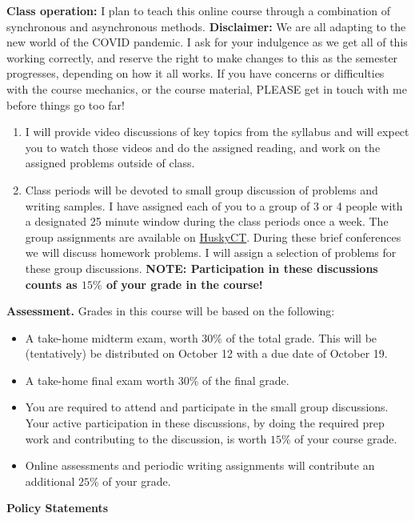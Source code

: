 \documentclass[12pt]{article}
\begin{document}
{\bf Class operation:} I plan to teach this online course through a combination of synchronous and asynchronous
methods.  {\bf Disclaimer:}  We are all adapting to the new world of the COVID pandemic.  I ask for your indulgence
as we get all of this working correctly, and reserve the right to make changes to this as the semester
progresses, depending on how it all works. If you have concerns or difficulties with the course
    mechanics, or the course material, PLEASE get in touch with me before things go too far!  
\begin{enumerate}
  \item I will provide video discussions of key topics from the syllabus and will expect you to watch those
    videos and do the assigned reading, and work on the assigned problems outside of class.
  \item Class periods will be devoted to small group discussion of problems
    and writing samples.  I have assigned each of you to a group of 3 or 4 people with a designated
    25 minute window during the class periods once a week.  The group assignments are available
    on \href{http://huckyct.uconn.edu}{HuskyCT}.  During these brief conferences we will discuss
    homework problems.  I will assign a selection of problems for these group discussions.
    {\bf NOTE: Participation in these discussions counts as $15\%$ of your grade in the course!}
\end{enumerate}

{\bf Assessment.}  Grades in this course will be based on the
following:
\begin{itemize}
\item A take-home midterm exam,  worth $30\%$ of the total grade.  This will be (tentatively)
  be distributed on October 12 with a due date of October 19.
\item A take-home final exam worth $30\%$ of the final grade.
\item You are required to attend and participate in the small group discussions.  Your active participation
  in these discussions, by doing the required prep work and contributing to the discussion, is worth
  $15\%$ of your course grade.
\item Online assessments and periodic writing assignments will contribute an additional $25\%$ of your grade.
\end{itemize}


\vfill\eject
\begin{center}

{\bf\Large Policy Statements}

\end{center}
\end{document}
